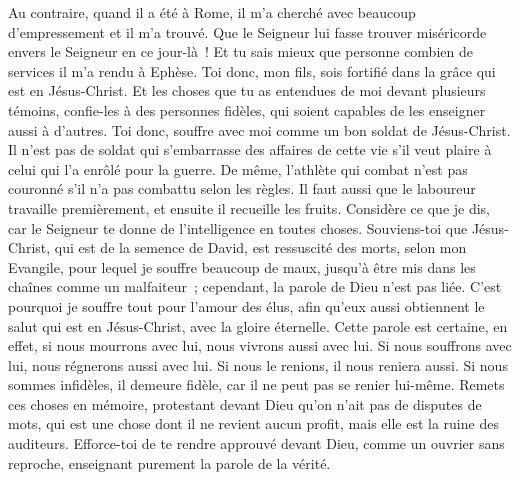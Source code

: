 \begin{multicols}{2}
Au contraire, quand il a été à Rome, il m'a cherché avec beaucoup d'empressement et il m'a trouvé.
Que le Seigneur lui fasse trouver miséricorde envers le Seigneur en ce jour-là~! Et tu sais mieux que personne combien  de services il m'a rendu à Ephèse.
\VerseOne{}Toi donc, mon fils, sois fortifié dans la grâce qui est en Jésus-Christ.
Et les choses que tu as entendues de moi devant plusieurs témoins, confie-les à des personnes fidèles, qui soient capables de les enseigner aussi à d'autres.
Toi donc, souffre avec moi comme un bon soldat de Jésus-Christ.
Il n'est pas de soldat qui s'embarrasse des affaires de cette vie s'il veut plaire à celui qui l'a enrôlé pour la guerre.
De même, l'athlète qui combat n'est pas couronné s'il n'a pas combattu selon les règles.
Il faut aussi que le laboureur travaille premièrement, et ensuite il recueille les fruits.
Considère ce que je dis, car le Seigneur te donne de l'intelligence en toutes choses.
Souviens-toi que Jésus-Christ, qui est de la semence de David, est ressuscité des morts, selon mon Evangile,
pour lequel je souffre beaucoup de maux, jusqu'à être mis dans les chaînes comme un malfaiteur~; cependant, la parole de Dieu n'est pas liée.
C'est pourquoi je souffre tout pour l'amour des élus, afin qu'eux aussi obtiennent le salut qui est en Jésus-Christ, avec la gloire éternelle.
Cette parole est certaine, en effet, si nous mourrons avec lui, nous vivrons aussi avec lui.
Si nous souffrons avec lui, nous régnerons aussi avec lui. Si nous le renions, il nous reniera aussi.
Si nous sommes infidèles, il demeure fidèle, car il ne peut pas se renier lui-même.
Remets ces choses en mémoire, protestant devant Dieu qu'on n'ait pas de disputes de mots, qui est une chose dont il ne revient aucun profit, mais elle est la ruine des auditeurs.
Efforce-toi de te rendre approuvé devant Dieu, comme un ouvrier sans reproche, enseignant purement la parole de la vérité.

\end{multicols}
